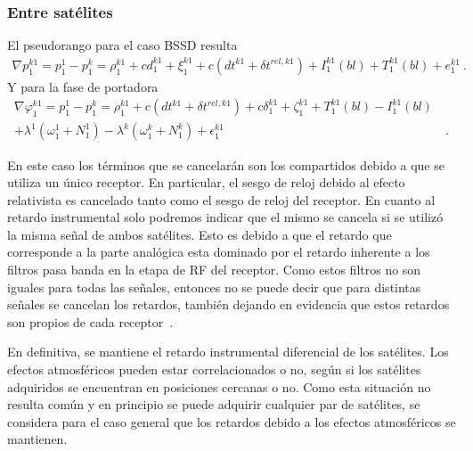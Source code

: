 \documentclass[a4paper,12pt,oneside,onecolumn,final,openright]{book}%
\begin{document}
\subsubsection{Entre satélites}
	El pseudorango para el caso BSSD resulta
\begin{align}\label{BSSD_pr}
	\nabla p_1^{k1} = p_1^1 - p_1^k = \rho_1^{k1} + cd_1^{k1} + \xi_1^{k1} + c\left( dt^{k1} + \delta t^{rel,k1} \right) + I_1^{k1}(bl) + T_1^{k1}(bl) + e_1^{k1} \ .
\end{align}
	Y para la fase de portadora 
\begin{align}\label{BSSD_fdp}
	\nabla \varphi_1^{k1} = p_1^1 - p_1^k = \rho_1^{k1} + c\left( dt^{k1} + \delta t^{rel,k1} \right) + c\delta_1^{k1} + \zeta_1^{k1} + T_1^{k1}(bl) - I_1^{k1}(bl) &\\
	+ \lambda^1\left( \omega_1^1 + N_1^1 \right) - \lambda^k\left( \omega_1^k + N_1^k \right) + \epsilon_1^{k1}& \ . \nonumber
\end{align}

	En este caso los términos que se cancelarán son los compartidos debido a que se utiliza un único receptor. En particular, el sesgo de reloj debido al efecto relativista es cancelado tanto como el sesgo de reloj del receptor. En cuanto al retardo instrumental solo podremos indicar que el mismo se cancela si se utilizó la misma señal de ambos satélites. Esto es debido a que el retardo que corresponde a la parte analógica esta dominado por el retardo inherente a los filtros pasa banda en la etapa de RF del receptor. Como estos filtros no son iguales para todas las señales, entonces no se puede decir que para distintas señales se cancelan los retardos, también dejando en evidencia que estos retardos son propios de cada receptor~\cite{psiakis}.
	
	En definitiva, se mantiene el retardo instrumental diferencial de los satélites. Los efectos atmosféricos pueden estar correlacionados o no, según si los satélites adquiridos se encuentran en posiciones cercanas o no. Como esta situación no resulta común y en principio se puede adquirir cualquier par de satélites, se considera para el caso general que los retardos debido a los efectos atmosféricos se mantienen.
\end{document}
